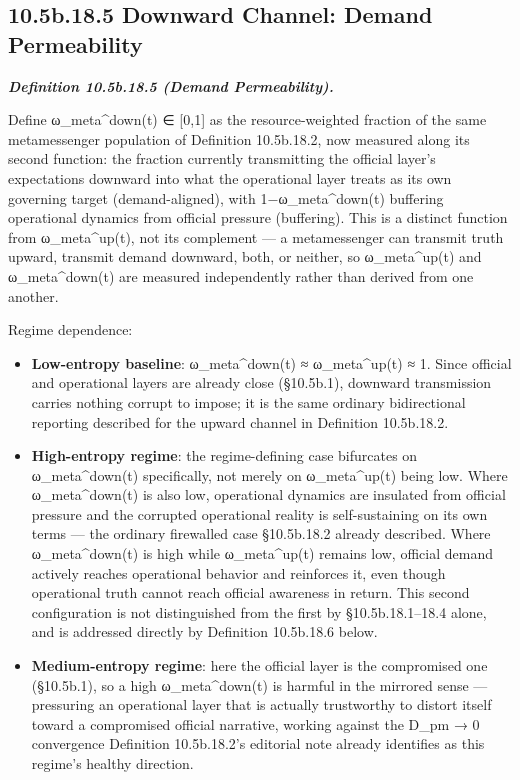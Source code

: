 \documentclass[
]{article}
\begin{document}
\hypertarget{b.18.5-downward-channel-demand-permeability}{%
\subsection{10.5b.18.5 Downward Channel: Demand
Permeability}\label{b.18.5-downward-channel-demand-permeability}}

\emph{\textbf{Definition 10.5b.18.5 (Demand Permeability).}}

Define ω\_meta\^{}down(t) ∈ {[}0,1{]} as the resource-weighted fraction
of the same metamessenger population of Definition 10.5b.18.2, now
measured along its second function: the fraction currently transmitting
the official layer's expectations downward into what the operational
layer treats as its own governing target (demand-aligned), with
1−ω\_meta\^{}down(t) buffering operational dynamics from official
pressure (buffering). This is a distinct function from ω\_meta\^{}up(t),
not its complement --- a metamessenger can transmit truth upward,
transmit demand downward, both, or neither, so ω\_meta\^{}up(t) and
ω\_meta\^{}down(t) are measured independently rather than derived from
one another.

Regime dependence:

\begin{itemize}
\item
  \textbf{Low-entropy baseline}: ω\_meta\^{}down(t) ≈ ω\_meta\^{}up(t) ≈
  1. Since official and operational layers are already close (§10.5b.1),
  downward transmission carries nothing corrupt to impose; it is the
  same ordinary bidirectional reporting described for the upward channel
  in Definition 10.5b.18.2.
\item
  \textbf{High-entropy regime}: the regime-defining case bifurcates on
  ω\_meta\^{}down(t) specifically, not merely on ω\_meta\^{}up(t) being
  low. Where ω\_meta\^{}down(t) is also low, operational dynamics are
  insulated from official pressure and the corrupted operational reality
  is self-sustaining on its own terms --- the ordinary firewalled case
  §10.5b.18.2 already described. Where ω\_meta\^{}down(t) is high while
  ω\_meta\^{}up(t) remains low, official demand actively reaches
  operational behavior and reinforces it, even though operational truth
  cannot reach official awareness in return. This second configuration
  is not distinguished from the first by §10.5b.18.1--18.4 alone, and is
  addressed directly by Definition 10.5b.18.6 below.
\item
  \textbf{Medium-entropy regime}: here the official layer is the
  compromised one (§10.5b.1), so a high ω\_meta\^{}down(t) is harmful in
  the mirrored sense --- pressuring an operational layer that is
  actually trustworthy to distort itself toward a compromised official
  narrative, working against the D\_pm → 0 convergence Definition
  10.5b.18.2's editorial note already identifies as this regime's
  healthy direction.
\end{itemize}
\end{document}
